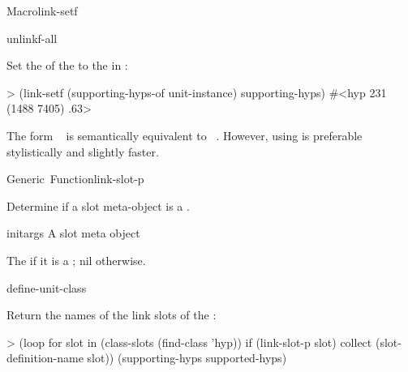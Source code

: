 \documentclass[10pt,twoside,english,pdftex]{article}
\begin{document}
\begin{functiondoc}{Macro}{link-setf}
\begin{alsos}{unlinkf-all}
\also[linkf]
\also[unlinkf]
\end{alsos}

\fnexample Set the   of the
  to the  in
:
\begin{example}
> (link-setf (supporting-hyps-of unit-instance) supporting-hyps)
#<hyp 231 (1488 7405) .63>
\end{example}

\fnnote 
{}%
The form \mbox{ 
  } is semantically equivalent to
\mbox{
  \code{)}}.  However, using
\textbf{} is preferable stylistically and
slightly faster.

\end{functiondoc}


\begin{functiondoc}{Generic~Function}{link-slot-p}{
 \returns{} }

\fnsyntax

\fnpurpose Determine if a slot meta-object is a .

\fnmethods
{}

\fnpackage {}

\fnmodule {}

\fnargs
\begin{args}{initargs}
\arg[slot] A slot meta object
\end{args}

\fnreturns The  if it is a ; nil otherwise.

\begin{alsos}{define-unit-class}
\end{alsos}

\fnexample
Return the names of the link slots of the  :
\begin{example}
> (loop for slot in (class-slots (find-class 'hyp)) 
     if (link-slot-p slot) collect (slot-definition-name slot))
(supporting-hyps supported-hyps)
\end{example}

\end{functiondoc}
\end{document}

